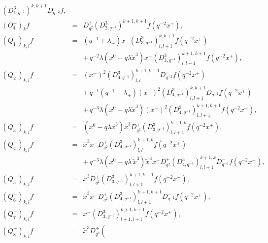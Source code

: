 \documentclass[a4paper,11pt,oneside]{article}
\begin{document}
\begin{enumerate}
\begin{eqnarray}
\left( D_{1,q^{-1}}^{3}\right) ^{k,k+1}D_{q^{-2}}^{-}f,  \nonumber \\
\left( O_{4}^{-}\right) _{k}f &=&D_{q^{2}}^{+}\left( D_{2,q^{-1}}^{3}\right)
^{k+1,k+1}f\left( q^{-2}x^{+}\right) ,  \nonumber \\[0.16in]
\left( Q_{1}^{-}\right) _{k,l}f &=&\left( q^{-1}+\lambda _{+}\right)
x^{-}\left( D_{3,q^{-1}}^{3}\right) _{l,l+1}^{k,k+1}f\left(
q^{-2}x^{+}\right) \\
&&+\,q^{-2}\lambda \left( x^{0}-q\lambda \tilde{x}^{3}\right) x^{-}\left(
D_{3,q^{-1}}^{3}\right) _{l,l+1}^{k+1,k+1}f\left( q^{-2}x^{+}\right) , 
\nonumber \\
\left( Q_{2}^{-}\right) _{k,l}f &=&\left( x^{-}\right) ^{2}\left(
D_{4,q^{-1}}^{3}\right) _{l,l}^{k+1,k+1}D_{q^{-2}}^{-}f\left(
q^{-2}x^{+}\right)  \nonumber \\
&&+\,q^{-1}\left( q^{-1}+\lambda _{+}\right) \left( x^{-}\right) ^{2}\left(
D_{4,q^{-1}}^{3}\right) _{l,l+1}^{k,k+1}D_{q^{-2}}^{-}f\left(
q^{-2}x^{+}\right)  \nonumber \\
&&+\,q^{-3}\lambda \left( x^{0}-q\lambda \tilde{x}^{3}\right) \left(
x^{-}\right) ^{2}\left( D_{4,q^{-1}}^{3}\right) _{l,l+1}^{k+1,k+1}f\left(
q^{-2}x^{+}\right) ,  \nonumber \\
\left( Q_{3}^{-}\right) _{k,l}f &=&\left( x^{0}-q\lambda \tilde{x}%
^{3}\right) \tilde{x}^{3}D_{q^{2}}^{+}\left( D_{3,q^{-1}}^{3}\right)
_{l,l+1}^{k+1,k}f\left( q^{-2}x^{+}\right) ,  \nonumber \\
\left( Q_{4}^{-}\right) _{k,l}f &=&\tilde{x}^{3}x^{-}D_{q^{2}}^{+}\left(
D_{4,q^{-1}}^{3}\right) _{l,l}^{k+1,k}f\left( q^{-2}x^{+}\right)  \nonumber
\\
&&+\,q^{-3}\lambda \left( x^{0}-q\lambda \,\tilde{x}^{3}\right) \tilde{x}%
^{3}x^{-}D_{q^{2}}^{+}\left( D_{4,q^{-1}}^{3}\right)
_{l,l+1}^{k+1,k}D_{q^{-2}}^{-}f\left( q^{-2}x^{+}\right) ,  \nonumber \\
\left( Q_{5}^{-}\right) _{k,l}f &=&\tilde{x}^{3}D_{q^{2}}^{+}\left(
D_{3,q^{-1}}^{3}\right) _{l,l+1}^{k+1,k+1}f\left( q^{-2}x^{+}\right) , 
\nonumber \\
\left( Q_{6}^{-}\right) _{k,l}f &=&\tilde{x}^{3}x^{-}D_{q^{2}}^{+}\left(
D_{4,q^{-1}}^{3}\right) _{l,l+1}^{k+1,k+1}D_{q^{-2}}^{-}f\left(
q^{-2}x^{+}\right) ,  \nonumber \\
\left( Q_{7}^{-}\right) _{k,l}f &=&x^{-}\left( D_{3,q^{-1}}^{3}\right)
_{l+1,l+1}^{k+1,k+1}f\left( q^{-2}x^{+}\right) ,  \nonumber \\
\left( Q_{8}^{-}\right) _{k,l}f &=&\tilde{x}^{3}D_{q^{2}}^{+}\left(

\end{eqnarray}
\end{enumerate}
\end{document}
